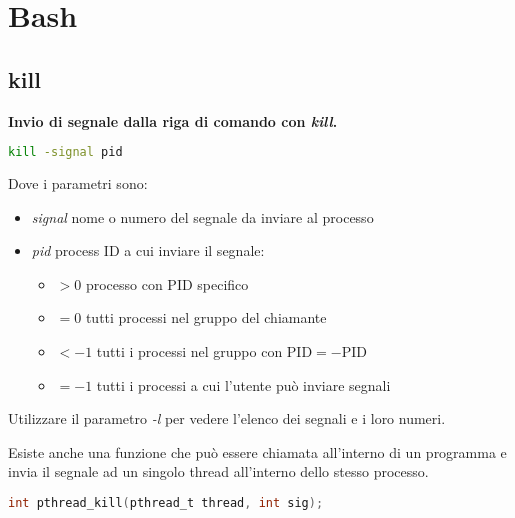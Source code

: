 \newpage
\section{Bash}

\subsection{kill}
\textbf{Invio di segnale dalla riga di comando con \textit{kill}.}\\
\begin{lstlisting}[language=BASH]
	kill -signal pid
\end{lstlisting}
Dove i parametri sono:
\begin{itemize}
	\item \textit{signal} nome o numero del segnale da inviare al processo
	\item \textit{pid} process ID a cui inviare il segnale:
	\begin{itemize}
		\item $>0$ processo con PID specifico
		\item $=0$ tutti processi nel gruppo del chiamante
		\item $<-1$ tutti i processi nel gruppo con PID$=-$PID
		\item $=-1$ tutti i processi a cui l'utente può inviare segnali
	\end{itemize}
\end{itemize}
\begin{note}
	Utilizzare il parametro \textit{-l} per vedere l'elenco dei segnali e i loro numeri.
\end{note}
Esiste anche una funzione che può essere chiamata all'interno di un programma e invia il segnale ad un singolo thread all'interno dello stesso processo.
\begin{lstlisting}[language=C]
	int pthread_kill(pthread_t thread, int sig);
\end{lstlisting}

